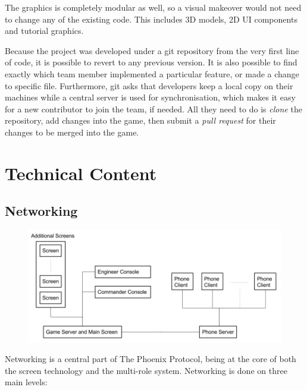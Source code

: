 \documentclass[a4paper,11pt]{article}
\begin{document}
The graphics is completely modular as well, so a visual makeover would not need to change any of the existing code. This includes 3D models, 2D UI components and tutorial graphics.

Because the project was developed under a git repository from the very first line of code, it is possible to revert to any previous version. It is also possible to find exactly which team member implemented a particular feature, or made a change to specific file. Furthermore, git asks that developers keep a local copy on their machines while a central server is used for synchronisation, which makes it easy for a new contributor to join the team, if needed. All they need to do is \emph{clone} the repository, add changes into the game, then submit a \emph{pull request} for their changes to be merged into the game.


\clearpage

\section{Technical Content}
\subsection{Networking}

\begin{figure}[ht]
	\centering
	\includegraphics[width=\textwidth]{images/network_diagram}
    \label{fig:network_diagram}
\end{figure}

Networking is a central part of The Phoenix Protocol, being at the core of both the screen technology and the multi-role system. Networking is done on three main levels:
\end{document}
